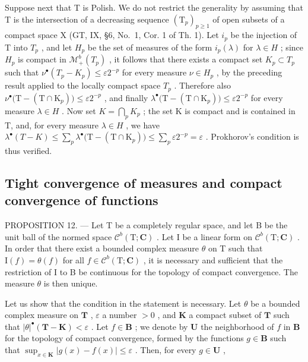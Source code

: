 Suppose next that T is Polish. We do not restrict the generality by assuming that T is the intersection of a decreasing sequence \((\mathrm{T}_{p})_{p\geqslant1}\) of open subsets of a compact space X (GT, IX, §6, No.~1, Cor. 1 of Th. 1). Let \(i_{p}\) be the injection of T into \(T_{p}\) , and let \(H_{p}\) be the set of measures of the form \(i_{p}(\lambda)\) for \(\lambda\in H\) ; since \(H_{p}\) is compact in \(\mathcal{M}_{+}^{b}(T_{p})\) , it follows that there exists a compact set \(K_{p}\subset T_{p}\) such that \(\nu^{\bullet}(T_{p}-K_{p})\leqslant\varepsilon2^{-p}\) for every measure \(\nu\in H_{p}\) , by the preceding result applied to the locally compact space \(T_{p}\) . Therefore also \(\nu^{\bullet}\big(\mathrm{T}-(\mathrm{T}\cap\mathrm{K}_{p})\big)\leqslant\varepsilon2^{-p}\) , and finally \(\lambda^{\bullet}\big(\mathrm{T}-(\mathrm{T}\cap\mathrm{K}_{p})\big)\leqslant\varepsilon2^{-p}\) for every measure \(\lambda\in H\) . Now set \(K=\bigcap_{p}K_{p}\) ; the set K is compact and is contained in T, and, for every measure \(\lambda\in H\) , we have \(\lambda^{\bullet}(T-K)\leqslant\sum_{p}\lambda^{\bullet}\big(\mathrm{T}-(\mathrm{T}\cap\mathrm{K}_{p})\big)\leqslant\sum_{p}\varepsilon2^{-p}=\varepsilon\) . Prokhorov's condition is thus verified.

\subsection{Tight convergence of measures and compact convergence of functions}

PROPOSITION 12. --- Let T be a completely regular space, and let B be the unit ball of the normed space \(\mathcal{C}^{b}(\mathrm{T};\mathbf{C})\) . Let I be a linear form on \(\mathcal{C}^{b}(\mathrm{T};\mathbf{C})\) . In order that there exist a bounded complex measure \(\theta\) on T such that \(\mathrm{I}(f)=\theta(f)\) for all \(f\in\mathcal{C}^{b}(\mathrm{T};\mathbf{C})\) , it is necessary and sufficient that the restriction of I to B be continuous for the topology of compact convergence. The measure \(\theta\) is then unique.

Let us show that the condition in the statement is necessary. Let \(\theta\) be a bounded complex measure on \(\mathbf{T}\) , \(\varepsilon\) a number \(>0\) , and \(\mathbf{K}\) a compact subset of \(\mathbf{T}\) such that \(|\theta|^{\bullet}(\mathbf{T} - \mathbf{K}) < \varepsilon\) . Let \(f \in \mathbf{B}\) ; we denote by \(\mathbf{U}\) the neighborhood of \(f\) in \(\mathbf{B}\) for the topology of compact convergence, formed by the functions \(g \in \mathbf{B}\) such that \(\sup_{x \in \mathbf{K}} |g(x) - f(x)| \leqslant \varepsilon\) . Then, for every \(g \in \mathbf{U}\) ,

